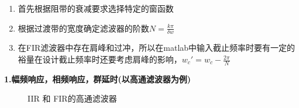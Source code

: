 \documentclass[UTF8]{ctexart}
\begin{document}
\begin{enumerate}
	\item 首先根据阻带的衰减要求选择特定的窗函数
	\item 根据过渡带的宽度确定滤波器的阶数$N=\frac{k\pi}{\delta w}$
	\item 在FIR滤波器中存在肩峰和过冲，所以在matlab中输入截止频率时要有一定的裕量在设计截止频率时还要考虑肩峰的影响，$w_c'=w_c-\frac{2\pi}{N}$
\end{enumerate}
\textbf{1.幅频响应，相频响应，群延时(以高通滤波器为例)}
\begin{figure}[H]
	\centering
	\quad
	\quad
	\caption{IIR 和 FIR的高通滤波器}
\end{figure}
\end{document}
